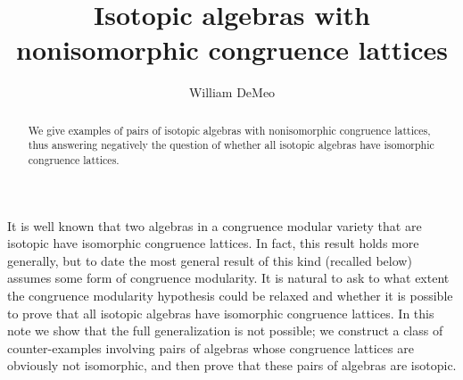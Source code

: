 \documentclass{au}
\theoremstyle{plain}
\theoremstyle{definition}
\theoremstyle{remark}
\newcommand{\<}{\ensuremath{\langle}}
\renewcommand{\>}{\ensuremath{\rangle}}
\begin{document}

\title[Isotopic algebras]{Isotopic algebras with nonisomorphic congruence lattices}

\author{William DeMeo}
\address{Department of Mathematics\\
University of South Carolina\\Columbia 29208\\USA}








\begin{abstract}
We give examples of pairs of isotopic algebras with nonisomorphic congruence
lattices, thus answering negatively the question of whether all isotopic
algebras have isomorphic congruence lattices.
\end{abstract}

\maketitle

It is well known that two algebras in a congruence modular variety that are
isotopic have isomorphic congruence lattices.  In fact, this result holds more
generally, but to date the most general result of this kind (recalled below)
assumes some form of congruence modularity. %
It is natural to ask to what extent the congruence modularity hypothesis could
be relaxed and whether it is possible to prove that all isotopic algebras have
isomorphic congruence lattices.   In this note we show
that the full generalization is not possible; we construct a class of
counter-examples involving pairs of algebras whose
congruence lattices are obviously not isomorphic, and then prove that these
pairs of algebras are isotopic.
\end{document}
